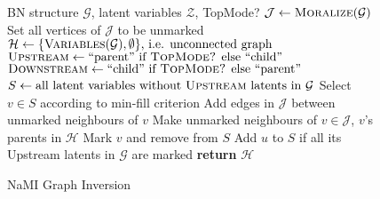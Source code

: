 \begin{wrapfigure}[18]{r}{0.567\textwidth}
\vspace{-2ex}	%
\begin{minipage}{0.555\textwidth}
\begin{algorithm}[H]
	\small
	\caption{NaMI Graph Inversion}
  \label{alg:invert-bn}
\begin{algorithmic}[1]
	 BN structure $\mathcal{G}$, latent variables $\mathcal{Z}$, {\sc TopMode?}
	\STATE $\mathcal{J}\gets\textnormal{\sc Moralize}(\mathcal{G})$
	\STATE Set all vertices of $\mathcal{J}$ to be unmarked
	\STATE $\mathcal{H}\gets\textnormal{$\{\textsc{Variables}(\mathcal{G}),\emptyset\}$, i.e. unconnected graph}$
	\STATE $\text{\sc Upstream}\gets\text{``parent'' if {\sc TopMode?} else ``child''}$
	\STATE $\text{\sc Downstream}\gets\text{``child'' if {\sc TopMode?} else ``parent''}$
	\STATE $S\gets\textnormal{all latent variables without {\sc Upstream} latents in $\mathcal{G}$}$
			\STATE Select $v\in S$ according to min-fill criterion
			\STATE Add edges in $\mathcal{J}$ between unmarked neighbours of $v$
			\STATE Make unmarked neighbours of $v\in\mathcal{J}$, $v$'s parents in $\mathcal{H}$
			\STATE Mark $v$ and remove from $S$
				\STATE \hspace*{-2ex}Add $u$ to $S$ if all its {\sc Upstream} latents in $\mathcal{G}$ are marked %
			\ENDFOR
		\ENDWHILE
	\STATE \textbf{return} $\mathcal{H}$
\end{algorithmic}
\end{algorithm}
\end{minipage}%
\end{wrapfigure}
